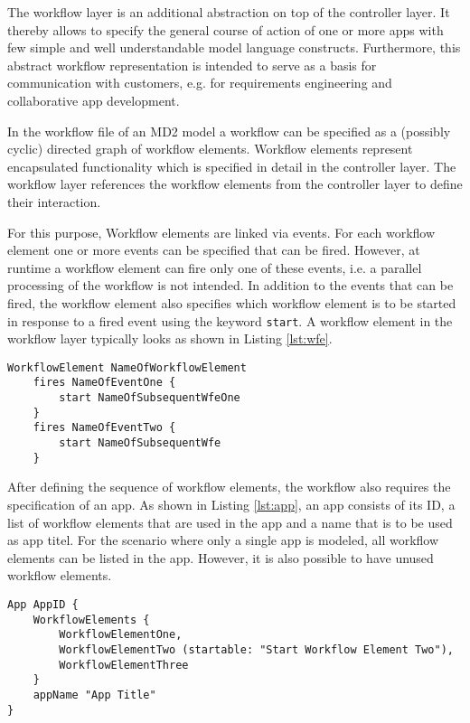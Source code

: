 
The workflow layer is an additional abstraction on top of the controller layer. It thereby allows to specify the general course of action of one or more apps with few simple and well understandable model language constructs. Furthermore, this abstract workflow representation is intended to serve as a basis for communication with customers, e.g. for requirements engineering and collaborative app development.

In the workflow file of an MD2 model a workflow can be specified as a (possibly cyclic) directed graph of workflow elements. Workflow elements represent encapsulated functionality which is specified in detail in the controller layer. The workflow layer references the workflow elements from the controller layer to define their interaction.

For this purpose, Workflow elements are linked via events. For each workflow element one or more events can be specified that can be fired. However, at runtime a workflow element can fire only one of these events, i.e. a parallel processing of the workflow is not intended. In addition to the events that can be fired, the workflow element also specifies which workflow element is to be started in response to a fired event using the keyword {\lstinline!start!}.
A workflow element in the workflow layer typically looks as shown in Listing \ref{lst:wfe}.

\begin{lstlisting}[language=MD2, label=lst:wfe, caption=Workflow Elements in the Workflow Layer]
 WorkflowElement NameOfWorkflowElement
 	fires NameOfEventOne {
		start NameOfSubsequentWfeOne
	}
	fires NameOfEventTwo {
		start NameOfSubsequentWfe
	}
\end{lstlisting}

After defining the sequence of workflow elements, the workflow also requires the specification of an app. As shown in Listing \ref{lst:app}, an app consists of its ID, a list of workflow elements that are used in the app and a name that is to be used as app titel. For the scenario where only a single app is modeled, all workflow elements can be listed in the app. However, it is also possible to have unused workflow elements.

\begin{lstlisting}[language=MD2, label=lst:app, caption=App Definition in MD2]
App AppID {
	WorkflowElements {
		WorkflowElementOne,
		WorkflowElementTwo (startable: "Start Workflow Element Two"),
		WorkflowElementThree 
	}
	appName "App Title"
}
\end{lstlisting}


